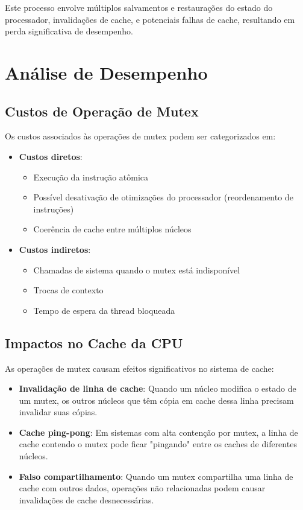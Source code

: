 \documentclass[12pt]{article}
\begin{document}
Este processo envolve múltiplos salvamentos e restaurações do estado do processador, invalidações de cache, e potenciais falhas de cache, resultando em perda significativa de desempenho.

\section{Análise de Desempenho}

\subsection{Custos de Operação de Mutex}

Os custos associados às operações de mutex podem ser categorizados em:

\begin{itemize}
    \item \textbf{Custos diretos}:
        \begin{itemize}
            \item Execução da instrução atômica
            \item Possível desativação de otimizações do processador (reordenamento de instruções)
            \item Coerência de cache entre múltiplos núcleos
        \end{itemize}
    \item \textbf{Custos indiretos}:
        \begin{itemize}
            \item Chamadas de sistema quando o mutex está indisponível
            \item Trocas de contexto
            \item Tempo de espera da thread bloqueada
        \end{itemize}
\end{itemize}

\subsection{Impactos no Cache da CPU}

As operações de mutex causam efeitos significativos no sistema de cache:

\begin{itemize}
    \item \textbf{Invalidação de linha de cache}: Quando um núcleo modifica o estado de um mutex, os outros núcleos que têm cópia em cache dessa linha precisam invalidar suas cópias.
    \item \textbf{Cache ping-pong}: Em sistemas com alta contenção por mutex, a linha de cache contendo o mutex pode ficar "pingando" entre os caches de diferentes núcleos.
    \item \textbf{Falso compartilhamento}: Quando um mutex compartilha uma linha de cache com outros dados, operações não relacionadas podem causar invalidações de cache desnecessárias.
\end{itemize}
\end{document}
